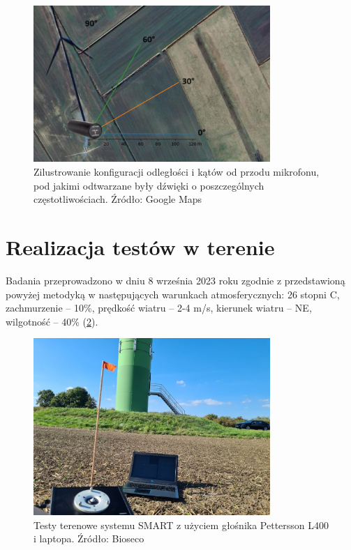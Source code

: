 \documentclass{sprz}
\begin{document}
\begin{figure}[h]
  \centering
  \includegraphics[width=0.8\textwidth]{sprz/angles.png}
  \caption{Zilustrowanie konfiguracji odległości i kątów od przodu mikrofonu, pod jakimi odtwarzane były dźwięki o poszczególnych częstotliwościach. Źródło: Google Maps}
  \label{img:angles}
\end{figure} 

\section{Realizacja testów w terenie}
Badania przeprowadzono w dniu 8 września 2023 roku zgodnie z przedstawioną powyżej metodyką w następujących warunkach atmosferycznych: 26 stopni C, zachmurzenie – 10\%, prędkość wiatru – 2-4 m/s, kierunek wiatru – NE, wilgotność – 40\% (\ref{img:fieldtests}).

\begin{figure}[h]
  \centering
  \includegraphics[width=0.8\textwidth]{sprz/fieldtests.png}
  \caption{Testy terenowe systemu SMART z użyciem głośnika Pettersson L400 i laptopa. Źródło: Bioseco}
  \label{img:fieldtests}
\end{figure}
\end{document}

